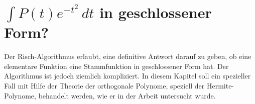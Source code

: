 %
%
%
\chapter{$\int P(t) e^{-t^2} \,dt$ in geschlossener Form?
\label{chapter:dreieck}}
\begin{refsection}

\noindent
Der Risch-Algorithmus erlaubt, eine definitive Antwort darauf zu geben,
ob eine elementare Funktion eine Stammfunktion in geschlossener Form hat.
Der Algorithmus ist jedoch ziemlich kompliziert.
In diesem Kapitel soll ein spezieller Fall mit Hilfe der Theorie der
orthogonale Polynome, speziell der Hermite-Polynome, behandelt werden,
wie er in der Arbeit \cite{dreieck:polint} untersucht wurde.






\printbibliography[heading=subbibliography]
\end{refsection}
